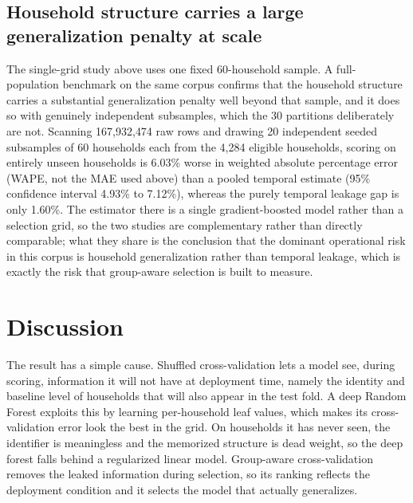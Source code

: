 \documentclass[forecasting,article,submit,oneauthor,pdftex]{Definitions/mdpi}
\begin{document}
\subsection{Household structure carries a large generalization penalty at scale}
\label{subsec:population}

The single-grid study above uses one fixed 60-household sample. A full-population
benchmark on the same corpus confirms that the household structure carries a
substantial generalization penalty well beyond that sample, and it does so with
genuinely independent subsamples, which the 30 partitions deliberately are not.
Scanning 167{,}932{,}474 raw rows and drawing 20 independent seeded subsamples of
60 households each from the 4{,}284 eligible households, scoring on entirely
unseen households is 6.03\% worse in weighted absolute percentage error (WAPE,
not the MAE used above) than a pooled temporal estimate (95\% confidence interval
4.93\% to 7.12\%), whereas the purely temporal leakage gap is only 1.60\%. The
estimator there is a single gradient-boosted model rather than a selection grid,
so the two studies are complementary rather than directly comparable; what they
share is the conclusion that the dominant operational risk in this corpus is
household generalization rather than temporal leakage, which is exactly the risk
that group-aware selection is built to measure.

\section{Discussion}

The result has a simple cause. Shuffled cross-validation lets a model see, during
scoring, information it will not have at deployment time, namely the identity and
baseline level of households that will also appear in the test fold. A deep
Random Forest exploits this by learning per-household leaf values, which makes its
cross-validation error look the best in the grid. On households it has never seen,
the identifier is meaningless and the memorized structure is dead weight, so the
deep forest falls behind a regularized linear model. Group-aware cross-validation
removes the leaked information during selection, so its ranking reflects the
deployment condition and it selects the model that actually generalizes.
\end{document}
